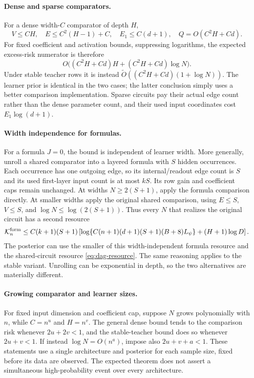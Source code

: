 \paragraph{Dense and sparse comparators.}
For a dense width-$C$ comparator of depth $H$,
\[
 V\le CH,\quad E\le C^2(H-1)+C,\quad
 E_1\le C(d+1),\quad Q=O(C^2H+Cd).
\]
For fixed coefficient and activation bounds, suppressing logarithms, the expected excess-risk numerator is therefore
\[
 O\big((C^2H+Cd)H+(C^2H+Cd)\log N\big).
\]
Under stable teacher rows it is instead
$\widetilde O((C^2H+Cd)(1+\log N))$.
The learner prior is identical in the two cases; the latter conclusion simply uses a better comparison implementation. Sparse circuits pay their actual edge count rather than the dense parameter count, and their used input coordinates cost $E_1\log(d+1)$.

\paragraph{Width independence for formulas.}
For a formula $J=0$, the bound is independent of learner width. More generally, unroll a shared comparator into a layered formula with $S$ hidden occurrences. Each occurrence has one outgoing edge, so its internal/readout edge count is $S$ and its used first-layer input count is at most $kS$. Its row gain and coefficient caps remain unchanged. At widths $N\ge2(S+1)$, apply the formula comparison directly. At smaller widths apply the original shared comparison, using $E\le S$, $V\le S$, and $\log N\le\log(2(S+1))$. Thus every $N$ that realizes the original circuit has a second resource
\[
 \mathcal K^{\rm form}_n
 \le C(k+1)(S+1)
 \left[\log\{C(n+1)(d+1)(S+1)(B+8)L_\psi\}
                         +(H+1)\log D\right].
\]
The posterior can use the smaller of this width-independent formula resource and the shared-circuit resource \eqref{eq:dag-resource}. The same reasoning applies to the stable variant. Unrolling can be exponential in depth, so the two alternatives are materially different.

\paragraph{Growing comparator and learner sizes.}
For fixed input dimension and coefficient cap, suppose $N$ grows polynomially with $n$, while $C=n^u$ and $H=n^v$. The general dense bound tends to the comparison risk whenever $2u+2v<1$, and the stable-teacher bound does so whenever $2u+v<1$. If instead $\log N=O(n^a)$, impose also $2u+v+a<1$. These statements use a single architecture and posterior for each sample size, fixed before its data are observed. The expected theorem does not assert a simultaneous high-probability event over every architecture.
